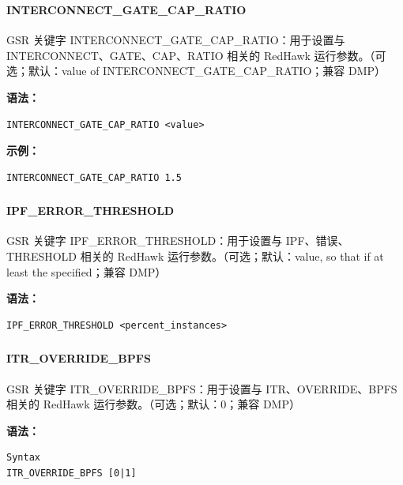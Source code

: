 \subsubsection{}
\paragraph*{INTERCONNECT_GATE_CAP_RATIO}

GSR 关键字 INTERCONNECT_GATE_CAP_RATIO：用于设置与 INTERCONNECT、GATE、CAP、RATIO 相关的 RedHawk 运行参数。（可选；默认：value of INTERCONNECT_GATE_CAP_RATIO；兼容 DMP）

\textbf{语法：}
\begin{lstlisting}
INTERCONNECT_GATE_CAP_RATIO <value>
\end{lstlisting}

\textbf{示例：}
\begin{lstlisting}
INTERCONNECT_GATE_CAP_RATIO 1.5
\end{lstlisting}

\subsubsection{}
\paragraph*{IPF_ERROR_THRESHOLD}

GSR 关键字 IPF_ERROR_THRESHOLD：用于设置与 IPF、错误、THRESHOLD 相关的 RedHawk 运行参数。（可选；默认：value, so that if at least the specified；兼容 DMP）

\textbf{语法：}
\begin{lstlisting}
IPF_ERROR_THRESHOLD <percent_instances>
\end{lstlisting}

\subsubsection{}
\paragraph*{ITR_OVERRIDE_BPFS}

GSR 关键字 ITR_OVERRIDE_BPFS：用于设置与 ITR、OVERRIDE、BPFS 相关的 RedHawk 运行参数。（可选；默认：0；兼容 DMP）

\textbf{语法：}
\begin{lstlisting}
Syntax
ITR_OVERRIDE_BPFS [0|1]
\end{lstlisting}

